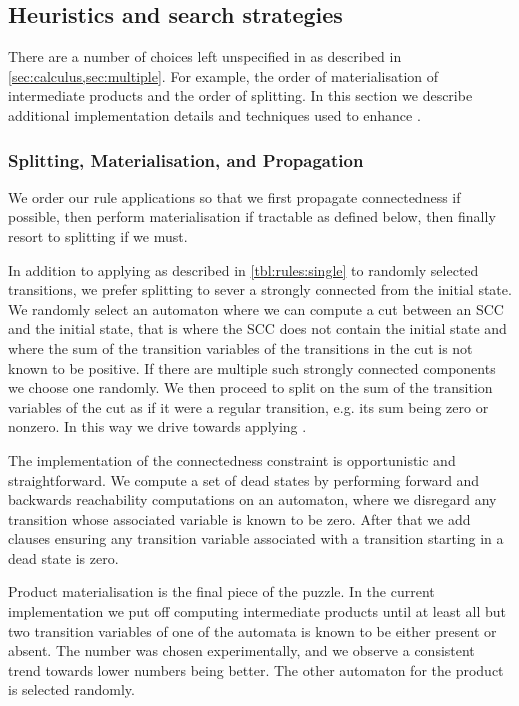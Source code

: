 \subsection{Heuristics and search strategies}

There are a number of choices left unspecified in \Calculus{} as described in
\cref{sec:calculus,sec:multiple}. For example, the order of materialisation of
intermediate products and the order of splitting. In this section we describe
additional implementation details and techniques used to enhance \Catra.

\subsubsection{Splitting, Materialisation, and Propagation}

We order our rule applications so that we first propagate connectedness if
possible, then perform materialisation if tractable as defined below, then
finally resort to splitting if we must.

In addition to applying \Split{} as described in \cref{tbl:rules:single} to
randomly selected transitions, we prefer splitting to sever a strongly connected
from the initial state. We randomly select an automaton where we can compute a
cut between an SCC and the initial state, that is where the SCC does not contain
the initial state and where the sum of the transition variables of the
transitions in the cut is not known to be positive. If there are multiple such
strongly connected components we choose one randomly. We then proceed to split
on the sum of the transition variables of the cut as if it were a regular
transition, e.g. its sum being zero or nonzero. In this way we drive \Calculus{}
towards applying \Propagate{}.

The implementation of the connectedness constraint is opportunistic and straightforward. We compute a set of dead states by performing forward and backwards reachability computations on an automaton, where we disregard any transition whose associated variable is known to be zero. After that we add clauses ensuring any transition variable associated with a transition starting in a dead state is zero.

Product materialisation is the final piece of the puzzle. In the current
implementation we put off computing intermediate products until at least all but
two transition variables of one of the automata is known to be either present or
absent. The number was chosen experimentally, and we observe a consistent trend
towards lower numbers being better. The other automaton for the product is
selected randomly.

